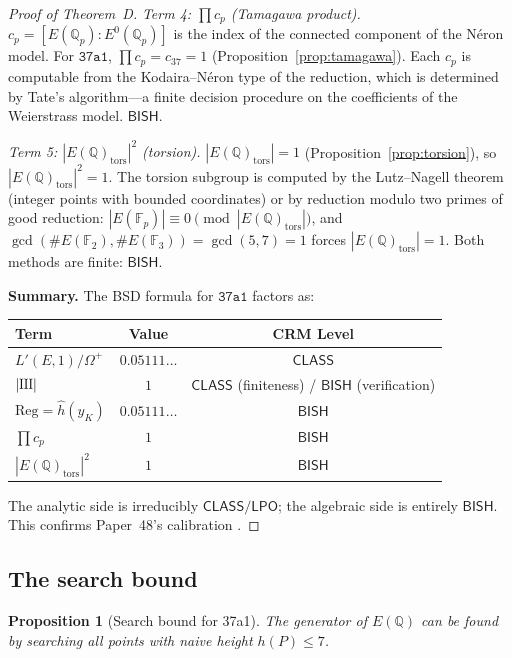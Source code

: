 \documentclass[11pt]{article}
\theoremstyle{plain}
\newtheorem{proposition}[theorem]{Proposition}
\theoremstyle{definition}
\theoremstyle{remark}
\newcommand{\Q}{\mathbb{Q}}
\newcommand{\F}{\mathbb{F}}
\newcommand{\Sha}{\text{\raisebox{0.05ex}{\scalebox{0.85}[1]{III}}}}
\newcommand{\Reg}{\mathrm{Reg}}
\newcommand{\BISH}{\ensuremath{\mathsf{BISH}}}
\newcommand{\LPO}{\ensuremath{\mathsf{LPO}}}
\newcommand{\CLASS}{\ensuremath{\mathsf{CLASS}}}
\newcommand{\hhat}{\hat{h}}
\begin{document}
\begin{proof}[Proof of Theorem~D]
\emph{Term 4: $\prod c_p$ (Tamagawa product).}
$c_p = [E(\Q_p) : E^0(\Q_p)]$ is the index of the connected component of the N\'eron model. For $\texttt{37a1}$, $\prod c_p = c_{37} = 1$ (Proposition~\ref{prop:tamagawa}). Each $c_p$ is computable from the Kodaira--N\'eron type of the reduction, which is determined by Tate's algorithm---a finite decision procedure on the coefficients of the Weierstrass model. $\BISH$.

\emph{Term 5: $|E(\Q)_{\mathrm{tors}}|^2$ (torsion).}
$|E(\Q)_{\mathrm{tors}}| = 1$ (Proposition~\ref{prop:torsion}), so $|E(\Q)_{\mathrm{tors}}|^2 = 1$. The torsion subgroup is computed by the Lutz--Nagell theorem (integer points with bounded coordinates) or by reduction modulo two primes of good reduction: $|E(\F_p)| \equiv 0 \pmod{|E(\Q)_{\mathrm{tors}}|}$, and $\gcd(\#E(\F_2), \#E(\F_3)) = \gcd(5, 7) = 1$ forces $|E(\Q)_{\mathrm{tors}}| = 1$. Both methods are finite: $\BISH$.

\medskip
\noindent\textbf{Summary.} The BSD formula for $\texttt{37a1}$ factors as:
\begin{center}
\begin{tabular}{lcc}
\toprule
Term & Value & CRM Level \\
\midrule
$L'(E,1)/\Omega^+$ & $0.05111\ldots$ & $\CLASS$ \\
$|\Sha|$ & $1$ & $\CLASS$ (finiteness) / $\BISH$ (verification) \\
$\Reg = \hhat(y_K)$ & $0.05111\ldots$ & $\BISH$ \\
$\prod c_p$ & $1$ & $\BISH$ \\
$|E(\Q)_{\mathrm{tors}}|^2$ & $1$ & $\BISH$ \\
\bottomrule
\end{tabular}
\end{center}
The analytic side is irreducibly $\CLASS/\LPO$; the algebraic side is entirely $\BISH$. This confirms Paper~48's calibration \cite{paper48}.
\end{proof}

\subsection{The search bound}

\begin{proposition}[Search bound for 37a1]\label{prop:search-bound}
The generator of $E(\Q)$ can be found by searching all points with naive height $h(P) \leq 7$.
\end{proposition}
\end{document}
